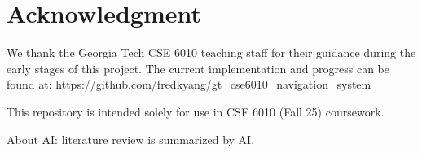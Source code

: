 \documentclass[fleqn,10pt]{olplainarticle}
\begin{document}
\section*{Acknowledgment}

We thank the Georgia Tech CSE 6010 teaching staff for their guidance during the early stages of this project.  
The current implementation and progress can be found at:  
\url{https://github.com/fredkyang/gt_cse6010_navigation_system}

This repository is intended solely for use in CSE 6010 (Fall 25) coursework.

About AI: literature review is summarized by AI.


\end{document}
